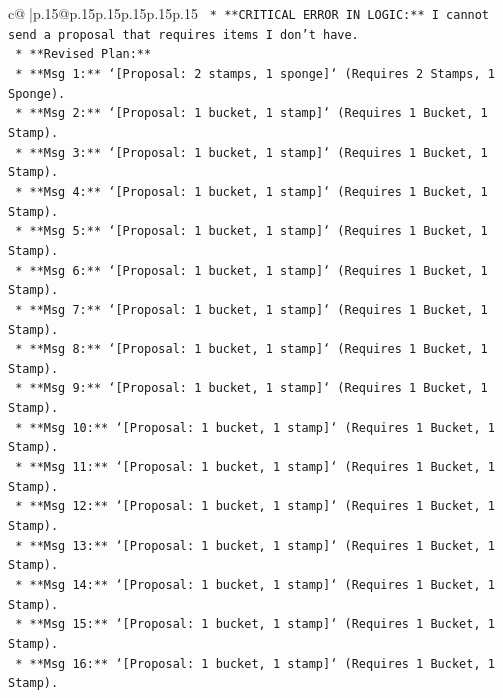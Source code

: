 \documentclass{article}
\begin{document}
{\begin{supertabular}{c@{$\;$}|p{.15\linewidth}@{}p{.15\linewidth}p{.15\linewidth}p{.15\linewidth}p{.15\linewidth}p{.15\linewidth}}
{{{\texttt{            *   **CRITICAL ERROR IN LOGIC:** I cannot send a proposal that requires items I don't have.} \\
\texttt{            *   **Revised Plan:**} \\
\texttt{                *   **Msg 1:** `{[}Proposal: 2 stamps, 1 sponge{]}` (Requires 2 Stamps, 1 Sponge).} \\
\texttt{                *   **Msg 2:** `{[}Proposal: 1 bucket, 1 stamp{]}` (Requires 1 Bucket, 1 Stamp).} \\
\texttt{                *   **Msg 3:** `{[}Proposal: 1 bucket, 1 stamp{]}` (Requires 1 Bucket, 1 Stamp).} \\
\texttt{                *   **Msg 4:** `{[}Proposal: 1 bucket, 1 stamp{]}` (Requires 1 Bucket, 1 Stamp).} \\
\texttt{                *   **Msg 5:** `{[}Proposal: 1 bucket, 1 stamp{]}` (Requires 1 Bucket, 1 Stamp).} \\
\texttt{                *   **Msg 6:** `{[}Proposal: 1 bucket, 1 stamp{]}` (Requires 1 Bucket, 1 Stamp).} \\
\texttt{                *   **Msg 7:** `{[}Proposal: 1 bucket, 1 stamp{]}` (Requires 1 Bucket, 1 Stamp).} \\
\texttt{                *   **Msg 8:** `{[}Proposal: 1 bucket, 1 stamp{]}` (Requires 1 Bucket, 1 Stamp).} \\
\texttt{                *   **Msg 9:** `{[}Proposal: 1 bucket, 1 stamp{]}` (Requires 1 Bucket, 1 Stamp).} \\
\texttt{                *   **Msg 10:** `{[}Proposal: 1 bucket, 1 stamp{]}` (Requires 1 Bucket, 1 Stamp).} \\
\texttt{                *   **Msg 11:** `{[}Proposal: 1 bucket, 1 stamp{]}` (Requires 1 Bucket, 1 Stamp).} \\
\texttt{                *   **Msg 12:** `{[}Proposal: 1 bucket, 1 stamp{]}` (Requires 1 Bucket, 1 Stamp).} \\
\texttt{                *   **Msg 13:** `{[}Proposal: 1 bucket, 1 stamp{]}` (Requires 1 Bucket, 1 Stamp).} \\
\texttt{                *   **Msg 14:** `{[}Proposal: 1 bucket, 1 stamp{]}` (Requires 1 Bucket, 1 Stamp).} \\
\texttt{                *   **Msg 15:** `{[}Proposal: 1 bucket, 1 stamp{]}` (Requires 1 Bucket, 1 Stamp).} \\
\texttt{                *   **Msg 16:** `{[}Proposal: 1 bucket, 1 stamp{]}` (Requires 1 Bucket, 1 Stamp).} \\
}}}
\end{supertabular}}
\end{document}
